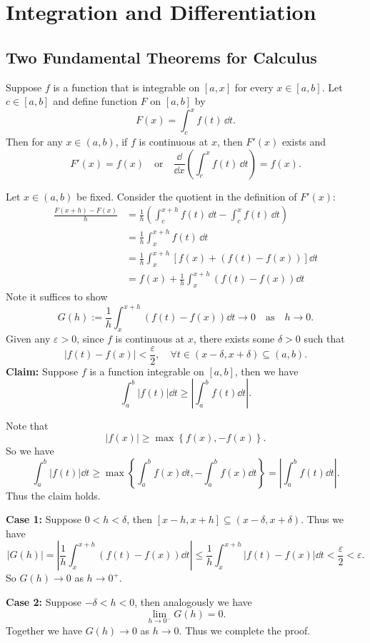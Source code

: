 	\chapter{Integration and Differentiation}
	\section{Two Fundamental Theorems for Calculus}
	\begin{theoremenv}
		Suppose $f$ is a function that is integrable on $[a,x]$ for every $x\in [a,b]$. Let $c\in [a,b]$ and define function $F$ on $[a,b]$ by
		\[
		F(x) = \int_c^x f(t)\, \dd t.
		\]
		Then for any $x\in (a,b)$, if $f$ is continuous at $x$, then $F'(x)$ exists and
		\[
		F'(x) = f(x)\quad\text{or}\quad \frac{\dd}{\dd x} \left( \int_c^x f(t)\, \dd t \right) = f(x).
		\]
		
	\end{theoremenv}
	\begin{proofenv}
		Let $x\in (a,b)$ be fixed. Consider the quotient in the definition of $F'(x)$:
		\[
		\begin{aligned}
			\frac{F(x+h)-F(x)}{h} 
			&= \frac{1}{h} \left( \int_c^{x+h} f(t)\, \dd t - \int_c^x f(t)\, \dd t \right) \\
			&= \frac{1}{h} \int_x^{x+h} f(t)\, \dd t\\
			&= \frac{1}{h} \int_x^{x+h} \left[ f(x)+\left(f(t)-f(x)\right)\right] \dd t\\
			&= f(x) + \frac{1}{h} \int_x^{x+h} \left( f(t)-f(x) \right) \dd t
		\end{aligned}
		\]
		Note it suffices to show 
		\[
		G(h):= \frac{1}{h} \int_x^{x+h} \left( f(t)-f(x) \right) \dd t \to 0 \quad \text{as}\quad h\to 0.
		\]
		Given any $\varepsilon>0$, since $f$ is continuous at $x$, there exists some $\delta>0$ such that
		\[
		|f(t)-f(x)| < \frac{\varepsilon}{2}, \quad \forall t\in (x-\delta, x+\delta)\subseteq (a,b).
		\]
		\textbf{Claim:} Suppose $f$ is a function integrable on $[a,b]$, then we have
		\[
		\int_a^b |f(t)| \dd t \geq \left| \int_a^b f(t) \dd t \right|.
		\]
		\begin{proofenv}
			Note that
			\[
			|f(x)| \ge \max\left\{ f(x), -f(x) \right\}.
			\]
			So we have
			\[
			\int_a^b |f(t)| \dd t \ge \max\left\{\int_a^b f(x)\dd t, -\int_a^b f(x)\dd t\right\} = \left|\int_a^b f(t) \dd t\right|.
			\]
			Thus the claim holds.
		\end{proofenv}
		\medskip

		\textbf{Case 1:} Suppose $0<h<\delta$, then $[x-h, x+h] \subseteq (x-\delta, x+\delta)$. Thus we have
		\[
		|G(h)| = \left| \frac{1}{h} \int_x^{x+h} \left( f(t)-f(x) \right) \dd t \right| \leq \frac{1}{h} \int_x^{x+h} |f(t)-f(x)| \dd t < \frac{\varepsilon}{2} < \varepsilon.
		\]
		So $G(h)\to 0$ as $h\to 0^+$.

		\textbf{Case 2:} Suppose $-\delta < h < 0$, then analogously we have
		\[
		\lim _{h\to 0^-} G(h) = 0.
		\]
		Together we have $G(h)\to 0$ as $h\to 0$. Thus we complete the proof.
	\end{proofenv}
